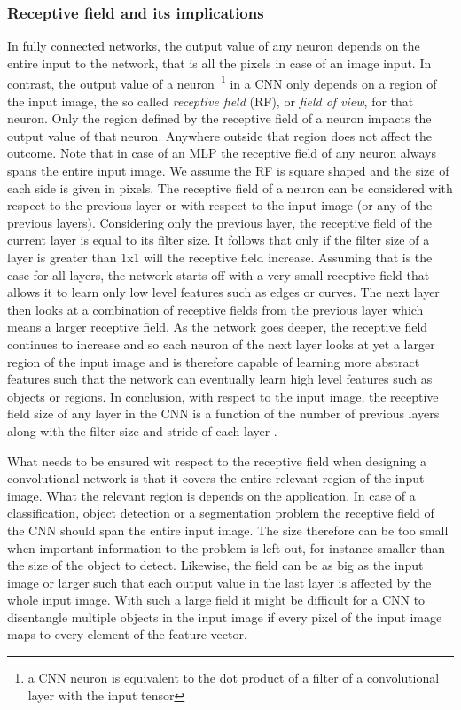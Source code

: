 \documentclass[12pt,a4paper]{article}
\begin{document}
\subsubsection{Receptive field and its implications}\label{sec:rf}
In fully connected networks, the output value of any neuron depends on the entire input to the network, that is all the pixels in case of an image input. In contrast, the output value of a neuron~\footnote{a CNN neuron is equivalent to the dot product of a filter of a convolutional layer with the input tensor} in a CNN only depends on a region of the input image, the so called \textit{receptive field} (RF), or \textit{field of view}, for that neuron. Only the region defined by the receptive field of a neuron impacts the output value of that neuron. Anywhere outside that region does not affect the outcome. Note that in case of an MLP the receptive field of any neuron always spans the entire input image. We assume the RF is square shaped and the size of each side is given in pixels. The receptive field of a neuron can be considered with respect to the previous layer or with respect to the input image (or any of the previous layers). Considering only the previous layer, the receptive field of the current layer is equal to its filter size. It follows that only if the filter size of a layer is greater than 1x1 will the receptive field increase. Assuming that is the case for all layers, the network starts off with a very small receptive field that allows it to learn only low level features such as edges or curves. The next layer then looks at a combination of receptive fields from the previous layer which means a larger receptive field. As the network goes deeper, the receptive field continues to increase and so each neuron of the next layer looks at yet a larger region of the input image and is therefore capable of learning more abstract features such that the network can eventually learn high level features such as objects or regions. In conclusion, with respect to the input image, the receptive field size of any layer in the CNN is a function of the number of previous layers along with the filter size and stride of each layer \cite{li_recept_field_2017}.

What needs to be ensured wit respect to the receptive field when designing a convolutional network is that it covers the entire relevant region of the input image. What the relevant region is depends on the application.
In case of a classification, object detection or a segmentation problem the receptive field of the CNN should span the entire input image.  The size therefore can be too small when important information to the problem is left out, for instance smaller than the size of the object to detect. Likewise, the field can be as big as the input image or larger such that each output value in the last layer is affected by the whole input image. With such a large field it might be difficult for a CNN to disentangle multiple objects in the input image if every pixel of the input image maps to every element of the feature vector. 
\end{document}
